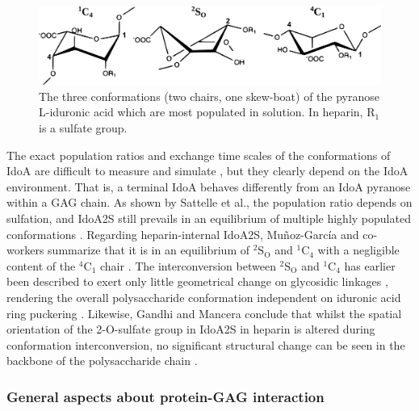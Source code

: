 \begin{figure}
\centering
\includegraphics[width=1.0\textwidth]{gfx/background/idoa_conformations_03.pdf}
\caption[]{
The three conformations (two chairs, one skew-boat) of the pyranose L-iduronic
acid which are most populated in solution. In heparin, $\mathrm{R}_1$ is a
sulfate group.}
\label{fig:bg:idoa_conformations}
\end{figure}


The exact population ratios and exchange time scales of the conformations of
IdoA are difficult to measure and simulate \cite{almond_jacs_2010,
structure_gags_progess_perspectives_2010}, but they clearly depend on the IdoA
environment. That is, a terminal IdoA behaves differently from an IdoA pyranose
within a GAG chain. As shown by Sattelle et al., the population ratio depends on
sulfation, and IdoA2S still prevails in an equilibrium of multiple highly
populated conformations \cite{almond_jacs_2010}. Regarding heparin-internal
IdoA2S, Muñoz-García and co-workers summarize that it is in an equilibrium of
${}^{2}\mathrm{S}_\mathrm{O}$ and ${}^{1}\mathrm{C}_4$ with a negligible content
of the ${}^{4}\mathrm{C}_1$ chair \cite{conf_idoa_timeavg_restraints_2013}. The
interconversion between ${}^{2}\mathrm{S}_\mathrm{O}$ and ${}^{1}\mathrm{C}_4$
has earlier been described to exert only little geometrical change on glycosidic
linkages \cite{Mulloy_dyn_conf_heparin_2000}, rendering the overall
polysaccharide conformation independent on iduronic acid ring puckering
\cite{jin_heparin_2009}. Likewise, Gandhi and Mancera conclude that whilst the
spatial orientation of the 2-O-sulfate group in IdoA2S in heparin is altered
during conformation interconversion, no significant structural change can be
seen in the backbone of the polysaccharide chain \cite{gandhi_structure_2008}.


\subsubsection{General aspects about protein-GAG interaction}

